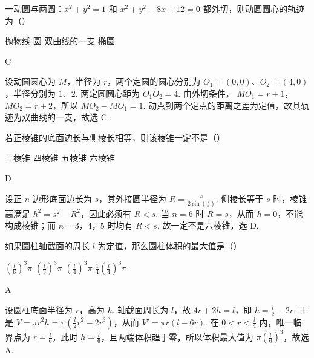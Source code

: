 \begin{problem}
一动圆与两圆：\(x^{2} + y^{2} = 1\) 和 \(x^{2} + y^{2} - 8x + 12 = 0\) 都外切，则动圆圆心的轨迹为（\quad）

\choices
    {抛物线}
    {圆}
    {双曲线的一支}
    {椭圆}
\end{problem}

\begin{answer}
C
\end{answer}

\begin{solution}
设动圆圆心为 \(M\)，半径为 \(r\)，两个定圆的圆心分别为
\(O_1=(0,0)\)、\(O_2=(4,0)\)，半径分别为 \(1\)、\(2\). 两定圆圆心距为
\(O_1O_2=4\). 由外切条件，
\(MO_1=r+1\)，\(MO_2=r+2\)，所以
\(MO_2-MO_1=1\). 动点到两个定点的距离之差为定值，故其轨迹为双曲线的一支，故选 C.
\end{solution}

\begin{problem}
若正棱锥的底面边长与侧棱长相等，则该棱锥一定不是（\quad）

\choices
    {三棱锥}
    {四棱锥}
    {五棱锥}
    {六棱锥}
\end{problem}

\begin{answer}
D
\end{answer}

\begin{solution}
设正 \(n\) 边形底面边长为 \(s\)，其外接圆半径为
\(R=\frac{s}{2\sin(\frac{\pi}{n})}\). 侧棱长等于 \(s\) 时，棱锥高满足
\(h^2=s^2-R^2\)，因此必须有 \(R<s\). 当 \(n=6\) 时
\(R=s\)，从而 \(h=0\)，不能构成棱锥；而 \(n=3\)，\(4\)，\(5\) 时均有 \(R<s\). 故一定不是六棱锥，选 D.
\end{solution}

\begin{problem}
如果圆柱轴截面的周长 \(l\) 为定值，那么圆柱体积的最大值是（\quad）

\choices
    {\(\left(\frac{l}{6}\right)^3\pi\)}
    {\(\left(\frac{l}{3}\right)^3\pi\)}
    {\(\left(\frac{l}{4}\right)^3\pi\)}
    {\(\frac{1}{4}\left(\frac{l}{4}\right)^3\pi\)}
\end{problem}

\begin{answer}
A
\end{answer}

\begin{solution}
设圆柱底面半径为 \(r\)，高为 \(h\). 轴截面周长为 \(l\)，故
\(4r+2h=l\)，即 \(h=\frac{l}{2}-2r\). 于是
\(V=\pi r^2h=\pi\left(\frac{l}{2}r^2-2r^3\right)\)，从而
\(V'=\pi r(l-6r)\).
在 \(0<r<\frac{l}{4}\) 内，唯一临界点为 \(r=\frac{l}{6}\)，此时
\(h=\frac{l}{6}\)，且两端体积趋于零，所以体积最大值为
\(\pi\left(\frac{l}{6}\right)^3\)，故选 A.
\end{solution}

